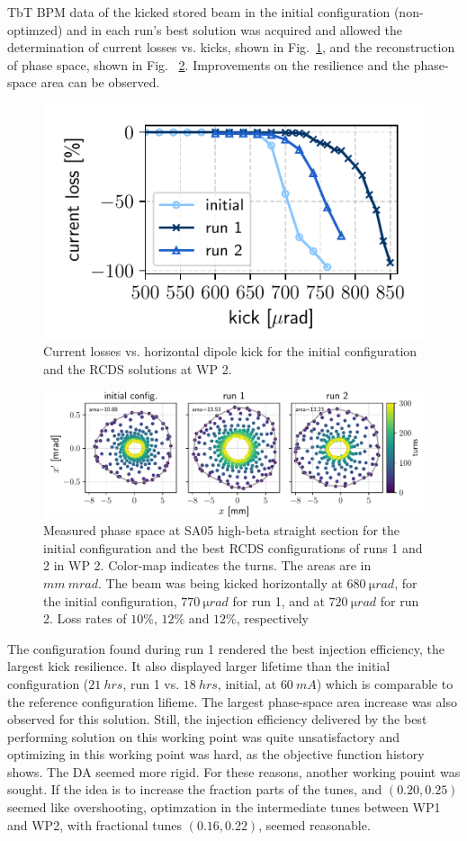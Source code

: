 TbT BPM data of the kicked stored beam  in the initial configuration (non-optimzed) and in each run's best solution was acquired and allowed the determination of current losses vs. kicks, shown in Fig.~\ref{fig:loss_kicks_newtunes}, and the reconstruction of phase space, shown in Fig. ~\ref{fig:newtunes_phase}. Improvements on the resilience and the phase-space area can be observed.
\begin{figure}
    \centering
    \includegraphics[width=0.7\columnwidth]{Images/WEPL087_f3.pdf}
    \caption{Current losses vs. horizontal dipole kick for the initial configuration and the RCDS solutions at WP 2.}
    \label{fig:loss_kicks_newtunes}
\end{figure}
\begin{figure}[tb]
    \includegraphics[width=\textwidth]{Images/WEPL087_f4.pdf}
    \caption{Measured phase space at SA05 high-beta straight section for the initial configuration and the best RCDS configurations of runs 1 and 2 in WP 2. Color-map indicates the turns. The areas are in $\unit{mm}~\unit{mrad}$. The beam was being kicked horizontally at $680~\unit{\micro rad}$, for the initial configuration, $770~\unit{\micro rad}$ for run 1, and at $720~\unit{\micro rad}$ for run 2. Loss rates of $10\%$, $12\%$ and $12\%$, respectively}
    \label{fig:newtunes_phase}
\end{figure}

The configuration found during run 1 rendered the best injection efficiency, the largest kick resilience. It also displayed larger lifetime than the initial configuration ($21~\unit{hrs}$, run 1 vs. $18~\unit{hrs}$, initial, at $60~\unit{mA}$) which is comparable to the reference configuration lifieme. The largest phase-space area increase was also observed for this solution. Still, the injection efficiency delivered by the best performing solution on this working point was quite unsatisfactory and optimizing in this working point was hard, as the objective function history shows. The DA seemed more rigid. For these reasons, another working pouint was sought. If the idea is to increase the fraction parts of the tunes, and $(0.20, 0.25)$ seemed like overshooting, optimzation in the intermediate tunes between WP1 and WP2, with fractional tunes $(0.16, 0.22)$, seemed reasonable.
